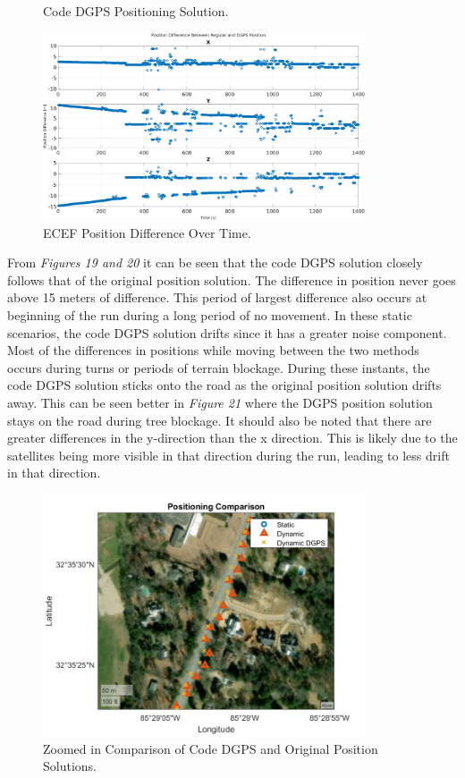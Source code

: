 \documentclass[11pt]{article}
\begin{document}
\begin{enumerate}[label=\textbf{\arabic*.}]
\begin{figure}[H]
        \caption{Code DGPS Positioning Solution.}
      \end{figure}
      \begin{figure}[H]
        \centering
        \includegraphics[width=0.85\textwidth]{p4_c.png}
        \caption{ECEF Position Difference Over Time.}
      \end{figure}
      From \emph{Figures 19 and 20} it can be seen that the  code DGPS solution closely 
      follows that of the original position solution. The difference in position never 
      goes above 15 meters of difference. This period of largest difference also occurs at 
      beginning of the run during a long period of no movement. In these static scenarios, 
      the code DGPS solution drifts since it has a greater noise component. Most of the 
      differences in positions while moving  between the two methods occurs during turns or 
      periods of terrain blockage. During these instants, the code DGPS solution sticks onto 
      the road as the original position solution drifts away. This can be seen better in 
      \emph{Figure 21} where the DGPS position solution stays on the road during tree 
      blockage. It should also be noted that there are greater differences in the 
      y-direction than the x direction. This is likely due to the satellites being more 
      visible in that direction during the run, leading to less drift in that direction.
      \begin{figure}[H]
        \centering
        \includegraphics[width=0.85\textwidth]{p4_e.png}
        \caption{Zoomed in Comparison of Code DGPS and Original Position Solutions.}
      \end{figure}

\end{enumerate}
\end{document}
